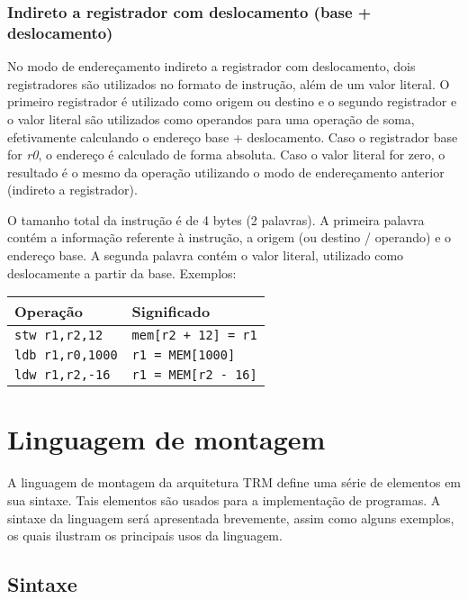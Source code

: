 \documentclass[11pt,a4paper]{report}
\begin{document}
\subsection{Indireto a registrador com deslocamento (base + deslocamento)}

No modo de endereçamento indireto a registrador com deslocamento, dois
registradores são utilizados no formato de instrução, além de um valor
literal. O primeiro registrador é utilizado como origem ou destino
e o segundo registrador e o valor literal são utilizados como operandos
para uma operação de soma, efetivamente calculando o endereço base + 
deslocamento. Caso o registrador base for \textit{r0}, o endereço é
calculado de forma absoluta. Caso o valor literal for zero, o resultado
é o mesmo da operação utilizando o modo de endereçamento anterior
(indireto a registrador). 

O tamanho total da instrução é de 4 bytes (2 palavras). A primeira
palavra contém a informação referente à instrução, a origem (ou destino
/ operando) e o endereço base. A segunda palavra contém o valor literal,
utilizado como deslocamente a partir da base. Exemplos:

\begin{table}[htb!]
\centering
\begin{tabular}{|p{5.0cm}|p{8.0cm}|}
\hline
\bf{Operação} & \bf{Significado} \\ \hline \hline
\texttt{stw r1,r2,12} & \verb|mem[r2 + 12] = r1| \\ \hline
\texttt{ldb r1,r0,1000} & \verb|r1 = MEM[1000]| \\ \hline
\texttt{ldw r1,r2,-16} & \verb|r1 = MEM[r2 - 16]| \\ \hline
\end{tabular}
\end{table}


\chapter{Linguagem de montagem}

A linguagem de montagem da arquitetura TRM define uma série de elementos
em sua sintaxe. Tais elementos são usados para a implementação de
programas. A sintaxe da linguagem será apresentada brevemente, assim como
alguns exemplos, os quais ilustram os principais usos da linguagem.

\section{Sintaxe}
\end{document}
